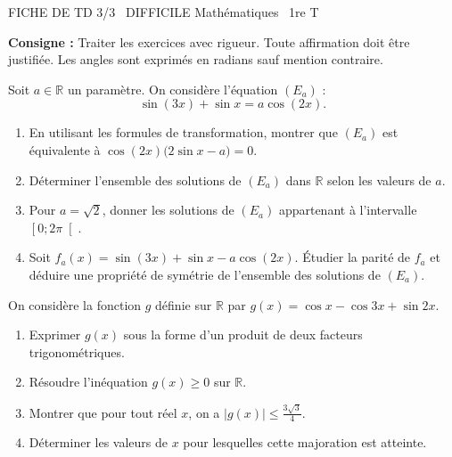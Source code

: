 \documentclass[11pt]{article}
\begin{document}
\begin{tcolorbox}[enhanced,colback=popink,colframe=popink,arc=10pt,boxrule=0pt,left=12pt,right=12pt,top=9pt,bottom=9pt]
{\color{white}\popxbold\small FICHE DE TD 3/3 \textbullet\ DIFFICILE \hfill Mathématiques \textbullet\ 1re T\par}
\end{tcolorbox}
\vspace{4pt}
\noindent\textbf{Consigne :} Traiter les exercices avec rigueur. Toute affirmation doit être justifiée. Les angles sont exprimés en radians sauf mention contraire.

\begin{exercice}
Soit $a \in \mathbb{R}$ un paramètre. On considère l'équation $(E_a)$ : 
\[
\sin(3x) + \sin x = a \cos(2x).
\]
\begin{enumerate}
    \item En utilisant les formules de transformation, montrer que $(E_a)$ est équivalente à 
    $\cos(2x)\bigl(2\sin x - a\bigr) = 0$.
    \item Déterminer l'ensemble des solutions de $(E_a)$ dans $\mathbb{R}$ selon les valeurs de $a$.
    \item Pour $a = \sqrt{2}$, donner les solutions de $(E_a)$ appartenant à l'intervalle $\left[0 ; 2\pi\right[$.
    \item Soit $f_a(x) = \sin(3x) + \sin x - a\cos(2x)$. Étudier la parité de $f_a$ et déduire une propriété de symétrie de l'ensemble des solutions de $(E_a)$.
\end{enumerate}
\end{exercice}

\begin{exercice}
On considère la fonction $g$ définie sur $\mathbb{R}$ par $g(x) = \cos x - \cos 3x + \sin 2x$.
\begin{enumerate}
    \item Exprimer $g(x)$ sous la forme d'un produit de deux facteurs trigonométriques.
    \item Résoudre l'inéquation $g(x) \ge 0$ sur $\mathbb{R}$.
    \item Montrer que pour tout réel $x$, on a $|g(x)| \le \frac{3\sqrt{3}}{4}$.
    \item Déterminer les valeurs de $x$ pour lesquelles cette majoration est atteinte.
\end{enumerate}
\end{exercice}
\end{document}
